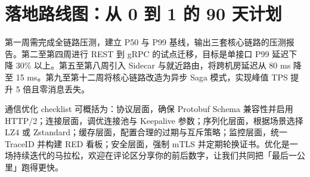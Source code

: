 \chapter{落地路线图：从 0 到 1 的 90 天计划}
第一周需完成全链路压测，建立 P50 与 P99 基线，输出三套核心链路的压测报告。第二至第四周进行 REST 到 gRPC 的试点迁移，目标是单接口 P99 延迟下降 30\%{} 以上。第五至第八周引入 Sidecar 与就近路由，将跨机房延迟从 80 ms 降至 15 ms。第九至第十二周将核心链路改造为异步 Saga 模式，实现峰值 TPS 提升 5 倍且零消息丢失。\par
通信优化 checklist 可概括为：协议层面，确保 Protobuf Schema 兼容性并启用 HTTP/2；连接层面，调优连接池与 Keepalive 参数；序列化层面，根据场景选择 LZ4 或 Zstandard；缓存层面，配置合理的过期与互斥策略；监控层面，统一 TraceID 并构建 RED 看板；安全层面，强制 mTLS 并定期轮换证书。优化是一场持续迭代的马拉松，欢迎在评论区分享你的前后数字，让我们共同把「最后一公里」跑得更快。\par

